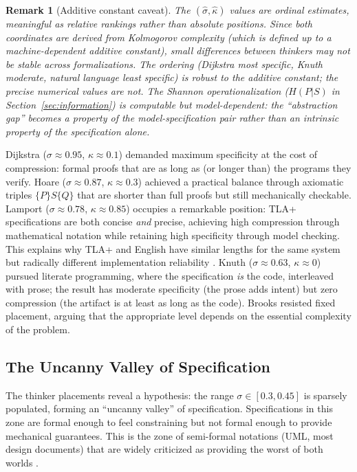 \documentclass[11pt, a4paper, logo, copyright]{googledeepmind}
\newtheorem*{remark}{Remark}
\begin{document}
\begin{remark}[Additive constant caveat]
The $(\hat{\sigma}, \hat{\kappa})$ values are ordinal estimates, meaningful as relative rankings rather than absolute positions. Since both coordinates are derived from Kolmogorov complexity (which is defined up to a machine-dependent additive constant), small differences between thinkers may not be stable across formalizations. The ordering (Dijkstra most specific, Knuth moderate, natural language least specific) is robust to the additive constant; the precise numerical values are not. The Shannon operationalization ($H(P|S)$ in Section~\ref{sec:information}) is computable but model-dependent: the ``abstraction gap'' becomes a property of the model-specification pair rather than an intrinsic property of the specification alone.
\end{remark}

Dijkstra ($\sigma \approx 0.95$, $\kappa \approx 0.1$) demanded maximum specificity at the cost of compression: formal proofs that are as long as (or longer than) the programs they verify. Hoare ($\sigma \approx 0.87$, $\kappa \approx 0.3$) achieved a practical balance through axiomatic triples $\{P\}S\{Q\}$ that are shorter than full proofs but still mechanically checkable. Lamport ($\sigma \approx 0.78$, $\kappa \approx 0.85$) occupies a remarkable position: TLA+ specifications are both concise \emph{and} precise, achieving high compression through mathematical notation while retaining high specificity through model checking. This explains why TLA+ and English have similar lengths for the same system but radically different implementation reliability \citep{newcombe2015amazon}. Knuth ($\sigma \approx 0.63$, $\kappa \approx 0$) pursued literate programming, where the specification \emph{is} the code, interleaved with prose; the result has moderate specificity (the prose adds intent) but zero compression (the artifact is at least as long as the code). Brooks resisted fixed placement, arguing that the appropriate level depends on the essential complexity of the problem.

\subsection{The Uncanny Valley of Specification}

The thinker placements reveal a hypothesis: the range $\sigma \in [0.3, 0.45]$ is sparsely populated, forming an ``uncanny valley'' of specification. Specifications in this zone are formal enough to feel constraining but not formal enough to provide mechanical guarantees. This is the zone of semi-formal notations (UML, most design documents) that are widely criticized as providing the worst of both worlds \citep{jackson2021essence}.
\end{document}
